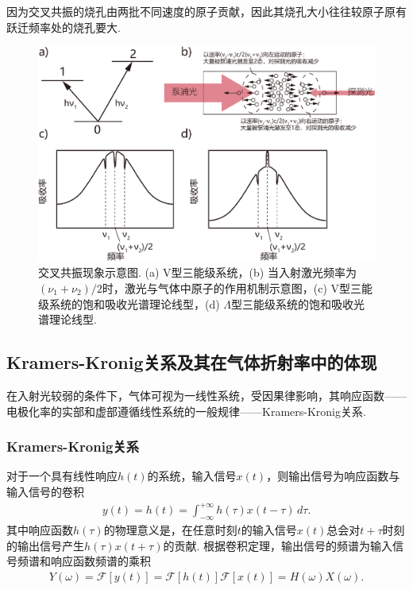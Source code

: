 \documentclass[a4paper, 10pt]{article}
\begin{document}
\begin{multicols*}{2}
因为交叉共振的烧孔由两批不同速度的原子贡献，因此其烧孔大小往往较原子原有跃迁频率处的烧孔要大.

\begin{figure}[H]
    \centering
    \includegraphics[width=.95\columnwidth]{CrossoverResonant.pdf}
    \caption{交叉共振现象示意图. (a) V型三能级系统，(b) 当入射激光频率为$(\nu_1+\nu_2)/2$时，激光与气体中原子的作用机制示意图，(c) V型三能级系统的饱和吸收光谱理论线型，(d) $\Lambda$型三能级系统的饱和吸收光谱理论线型.}
    \label{crossover-resonant}
\end{figure}

\subsection{Kramers-Kronig关系及其在气体折射率中的体现}
在入射光较弱的条件下，气体可视为一线性系统，受因果律影响，其响应函数——电极化率的实部和虚部遵循线性系统的一般规律——Kramers-Kronig关系.

\subsubsection{Kramers-Kronig关系}
对于一个具有线性响应$h(t)$的系统，输入信号$x(t)$，则输出信号为响应函数与输入信号的卷积
\begin{align}
    y(t)=h(t)=\int_{-\infty}^{+\infty}h(\tau)x(t-\tau)\,d\tau.
\end{align}
其中响应函数$h(\tau)$的物理意义是，在任意时刻$t$的输入信号$x(t)$总会对$t+\tau$时刻的输出信号产生$h(\tau)x(t+\tau)$的贡献.
根据卷积定理，输出信号的频谱为输入信号频谱和响应函数频谱的乘积
\begin{align}
    Y(\omega)=\mathscr{F}[y(t)]=\mathscr{F}[h(t)]\mathscr{F}[x(t)]=H(\omega)X(\omega).
\end{align}


\end{multicols*}
\end{document}
